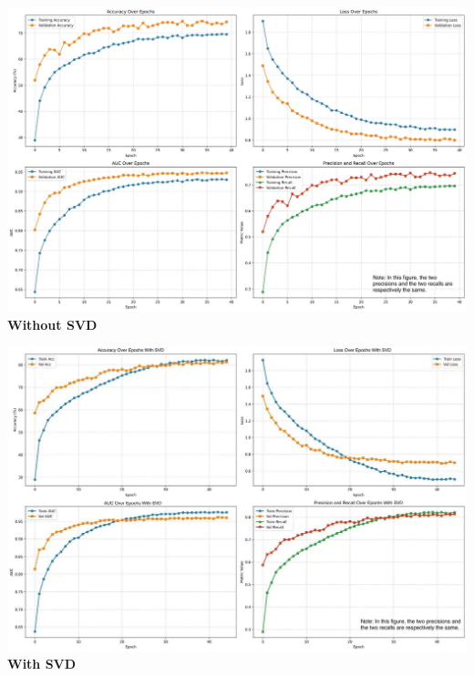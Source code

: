 \documentclass[a1paper,portrait,margin=0.8cm]{baposter}
\begin{document}
\begin{poster}
{\begin{minipage}[t]{0.35\textwidth}
    \end{minipage}
    \hfill 
    \begin{minipage}[t]{0.315\textwidth} 
        
        \includegraphics[width=\linewidth]{without svd.jpg}
        \centering
        \textbf{Without SVD} 
    \end{minipage}
    \hfill
    \begin{minipage}[t]{0.315\textwidth} 
        
        \includegraphics[width=\linewidth]{with svd.jpg}
        \centering
        \textbf{With SVD} 
    \end{minipage}

\vspace{-0.5em}
}

{

}
\end{poster}
\end{document}

